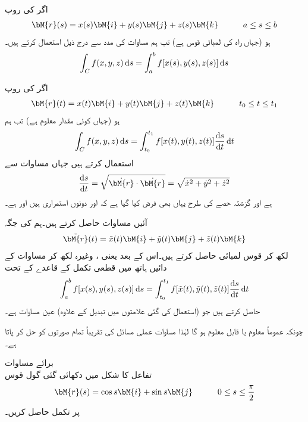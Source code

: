 اگر  کی روپ
\begin{align*}
\bM{r}(s)=x(s)\bM{i}+y(s)\bM{j}+z(s)\bM{k}\quad \quad \quad a\le s\le b
\end{align*}
ہو (جہاں  راہ  کی لمبائی قوس ہے) تب ہم مساوات  کی مدد سے درج ذیل استعمال کرتے ہیں۔
\begin{align}\label{مساوات_خطی_تکمل_حصول_الف}
\int_C f(x,y,z)\dif s=\int_a^b f[x(s),y(s),z(s)]\dif s
\end{align}

اگر  کی روپ
\begin{align*}
\bM{r}(t)=x(t)\bM{i}+y(t)\bM{j}+z(t)\bM{k}\quad \quad \quad t_0\le t\le t_1
\end{align*}
ہو (جہاں  کوئی مقدار معلوم ہے) تب ہم 
\begin{align}\label{مساوات_خطی_تکمل_حصول_ب}
\int_C f(x,y,z)\dif s=\int_{t_0}^{t_1} f[x(t),y(t),z(t)]\frac{\dif s}{\dif t}\dif t
\end{align}
استعمال کرتے ہیں جہاں مساوات  سے
\begin{align*}
\frac{\dif s}{\dif t}=\sqrt{\dot{\bM{r}}\cdot \dot{\bM{r}}}=\sqrt{\dot{x}^2+\dot{y}^2+\dot{z}^2}
\end{align*}
ہے اور گزشتہ حصے کی طرح یہاں بھی  فرض کیا گیا ہے  کہ  اور  دونوں استمراری ہیں اور  ہے۔

آئیں مساوات  حاصل کرتے ہیں۔ہم  کی جگہ
\begin{align*}
\tilde{\bM{r}}(t)=\tilde{x}(t)\bM{i}+\tilde{y}(t)\bM{j}+\tilde{z}(t)\bM{k}
\end{align*}
لکھ کر قوس لمبائی  حاصل کرتے ہیں۔اس کے بعد  یعنی ، وغیرہ لکھ کر مساوات  کے دائیں ہاتھ میں قطعی تکمل کے قاعدے کے تحت 
\begin{align*}
\int_a^b f[x(s),y(s),z(s)]\dif s=\int_{t_0}^{t_1} f[\tilde{x}(t),\tilde{y}(t),\tilde{z}(t)]\frac{\dif s}{\dif t}\dif t
\end{align*}
حاصل کرتے ہیں جو (استعمال کی گئی علامتوں میں تبدیل کے علاوہ) عین مساوات  ہے۔

چونکہ عموماً  معلوم یا قابل معلوم ہو گا لہٰذا  مساوات  عملی مسائل کی تقریباً تمام صورتوں کو حل کر پاتا ہے۔

\quad برائے مساوات \\
تفاعل  کا شکل  میں دکھائی گئی گول قوس
\begin{align*}
\bM{r}(s)=\cos s\bM{i}+\sin s\bM{j}\quad \quad \quad 0\le s\le \frac{\pi}{2}
\end{align*}
 پر تکمل حاصل کریں۔

